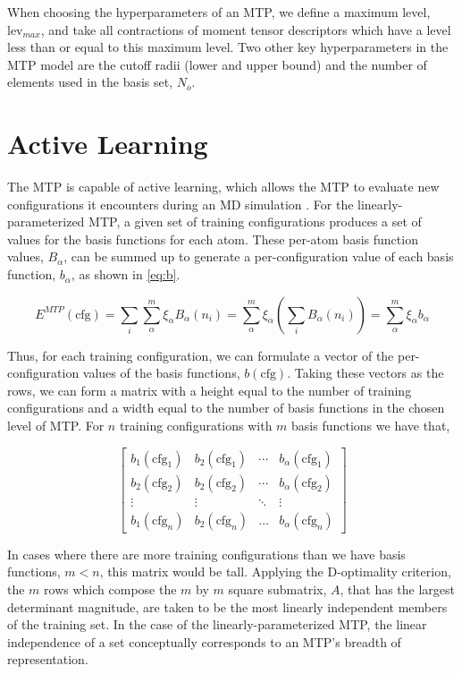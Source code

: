 \documentclass[9pt,twocolumn,twoside]{opticajnl}
\begin{document}
When choosing the hyperparameters of an MTP, we define a maximum level, $\textrm{lev}_{max}$, and take all contractions of moment tensor descriptors which have a level less than or equal to this maximum level. Two other key hyperparameters in the MTP model are the cutoff radii (lower and upper bound) and the number of elements used in the basis set, $N_o$.

\section{Active Learning}
The MTP is capable of active learning, which allows the MTP to evaluate new configurations it encounters during an MD simulation \cite{mlip}. For the linearly-parameterized MTP, a given set of training configurations produces a set of values for the basis functions for each atom. These per-atom basis function values, $B_\alpha$, can be summed up to generate a per-configuration value of each basis function, $b_\alpha$, as shown in \ref{eq:b}.

\begin{equation} \label{eq:b}
  E^{MTP}(\textrm{cfg}) = \sum_i \sum_\alpha^m \xi_\alpha B_\alpha (n_i) = \sum_\alpha^m \xi_\alpha (\sum_i  B_\alpha (n_i)) = \sum_\alpha^m \xi_\alpha b_\alpha
\end{equation}

Thus, for each training configuration, we can formulate a vector of the per-configuration values of the basis functions, $b(\textrm{cfg})$. Taking these vectors as the rows, we can form a matrix with a height equal to the number of training configurations and a width equal to the number of basis functions in the chosen level of MTP.  For $n$ training configurations with $m$ basis functions we have that,

\[
\begin{bmatrix} 
    b_{1}(\textrm{cfg}_1)  & b_{2}(\textrm{cfg}_1)  & \cdots & b_{\alpha}(\textrm{cfg}_1) \\
    b_{2}(\textrm{cfg}_2)  & b_{2}(\textrm{cfg}_2)  & \cdots & b_{\alpha}(\textrm{cfg}_2) \\
    \vdots & \vdots & \ddots & \vdots \\ 
    b_{1}(\textrm{cfg}_n)       & b_{2}(\textrm{cfg}_n)  & \dots & b_{\alpha}(\textrm{cfg}_n) 
\end{bmatrix}
\]


In cases where there are more training configurations than we have basis functions, $m < n$, this matrix would be tall. Applying the D-optimality criterion, the $m$ rows which compose the $m$ by $m$ square submatrix, $A$, that has the largest determinant magnitude, are taken to be the most linearly independent members of the training set. In the case of the linearly-parameterized MTP, the linear independence of a set conceptually corresponds to an MTP's breadth of representation.
\end{document}
